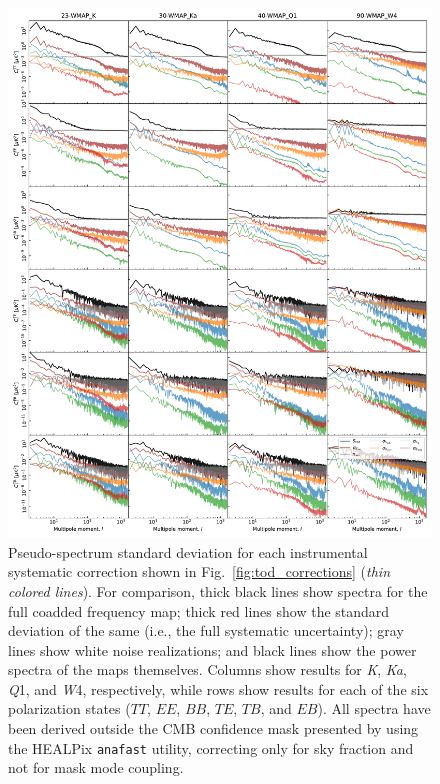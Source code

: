 \documentclass[twocolumn]{../../common/aa}
\newcommand{\K}[0]{\textit K}
\newcommand{\Ka}[0]{\textit{Ka}}
\newcommand{\Q}[0]{\textit Q}
\newcommand{\W}[0]{\textit W}
\begin{document}
\begin{figure}
  \center	
   \includegraphics[width=0.95\linewidth]{figures/components_power_spectrum_std_masked_WMAP_new_rms.pdf}
  \caption{Pseudo-spectrum standard deviation for each instrumental
    systematic correction shown in
    Fig.~\ref{fig:tod_corrections} (\emph{thin
      colored lines}). For comparison, thick black lines show spectra
    for the full coadded frequency map; thick red lines show the
    standard deviation of the same (i.e., the full systematic
    uncertainty); gray lines show white noise realizations; and black lines
    show the power spectra of the maps themselves. Columns show results for \K,
    \Ka, \Q1, and \W4, respectively, while rows show results for each of
    the six polarization states ($TT$, $EE$, $BB$, $TE$, $TB$, and
    $EB$). All spectra have been derived outside the CMB confidence
    mask presented by \citet{bp13} using the HEALPix \texttt{anafast}
    utility, correcting only for sky fraction and not for mask mode
    coupling. }
  \label{fig:corrmap_stddev}
\end{figure}
\end{document}
